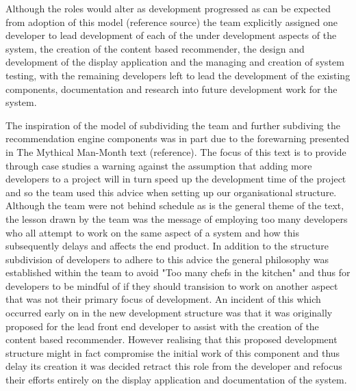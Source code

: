 \documentclass{l3proj}
\begin{document}
Although the roles would alter as development progressed as can be expected from adoption of this model (reference source) the team explicitly assigned one developer to lead development of each of the under development aspects of the system, the creation of the content based recommender, the design and development of the display application and the managing and creation of system testing, with the remaining developers left to lead the development of the existing components, documentation and research into future development work for the system. 

The inspiration of the model of subdividing the team and further subdiving the recommendation engine components was in part due to the forewarning presented in The Mythical Man-Month text (reference). The focus of this text is to provide through case studies a warning against the assumption that adding more developers to a project will in turn speed up the development time of the project and so the team used this advice when setting up our organisational structure. Although the team were not behind schedule as is the general theme of the text, the lesson drawn by the team was the message of employing too many developers who all attempt to work on the same aspect of a system and how this subsequently delays and affects the end product. In addition to the structure subdivision of developers to adhere to this advice the general philosophy was established within the team to avoid "Too many chefs in the kitchen" and thus for developers to be mindful of if they should transision to work on another aspect that was not their primary focus of development. An incident of this which occurred early on in the new development structure was that it was originally proposed for the lead front end developer to assist with the creation of the content based recommender. However realising that this proposed development structure might in fact compromise the initial work of this component and thus delay its creation it was decided retract this role from the developer and refocus their efforts entirely on the display application and documentation of the system. %
\end{document}
